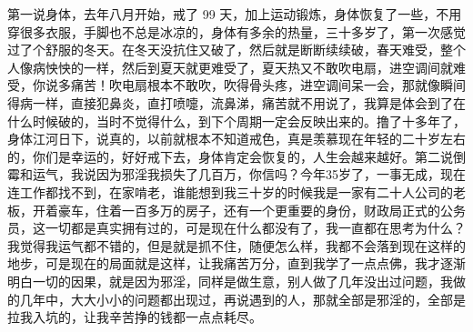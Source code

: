 \begin{case}
    第一说身体，去年八月开始，戒了 99 天，加上运动锻炼，身体恢复了一些，不用穿很多衣服，手脚也不总是冰凉的，身体有多余的热量，三十多岁了，第一次感觉过了个舒服的冬天。在冬天没抗住又破了，然后就是断断续续破，春天难受，整个人像病怏怏的一样，然后到夏天就更难受了，夏天热又不敢吹电扇，进空调间就难受，你说多痛苦！吹电扇根本不敢吹，吹得骨头疼，进空调间呆一会，那就像瞬间得病一样，直接犯鼻炎，直打喷嚏，流鼻涕，痛苦就不用说了，我算是体会到了在什么时候破的，当时不觉得什么，到下个周期一定会反映出来的。撸了十多年了，身体江河日下，说真的，以前就根本不知道戒色，真是羡慕现在年轻的二十岁左右的，你们是幸运的，好好戒下去，身体肯定会恢复的，人生会越来越好。第二说倒霉和运气，我说因为邪淫我损失了几百万，你信吗？今年35岁了，一事无成，现在连工作都找不到，在家啃老，谁能想到我三十岁的时候我是一家有二十人公司的老板，开着豪车，住着一百多万的房子，还有一个更重要的身份，财政局正式的公务员，这一切都是真实拥有过的，可是现在什么都没有了，我一直都在思考为什么？我觉得我运气都不错的，但是就是抓不住，随便怎么样，我都不会落到现在这样的地步，可是现在的局面就是这样，让我痛苦万分，直到我学了一点点佛，我才逐渐明白一切的因果，就是因为邪淫，同样是做生意，别人做了几年没出过问题，我做的几年中，大大小小的问题都出现过，再说遇到的人，那就全部是邪淫的，全部是拉我入坑的，让我辛苦挣的钱都一点点耗尽。


\end{case}
